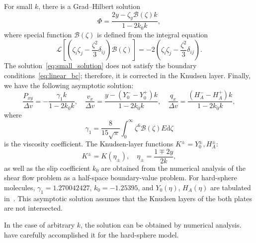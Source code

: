 \documentclass[]{elsarticle} %
\newcommand{\dd}{\mathrm{d}}
\begin{document}
For small \(k\), there is a Grad--Hilbert solution~\citep[see e.g.][]{Ohwada1990, Sone2007}
\begin{equation}\label{eq:small_solution}
    \Phi = \frac{2y - \zeta_y \mathcal{B}(\zeta) k}{1-2k_0k},
\end{equation}
where special function \(\mathcal{B}(\zeta)\) is defined from the integral equation
\begin{equation}\label{eq:transport_B}
    \mathcal{L}\left[\left(\zeta_i\zeta_j-\frac{\zeta^2}3\delta_{ij}\right) \mathcal{B}(\zeta)\right]
        = -2\left(\zeta_i\zeta_j-\frac{\zeta^2}3\delta_{ij}\right).
\end{equation}
The solution~\eqref{eq:small_solution} does not satisfy the boundary conditions~\eqref{eq:linear_bc};
therefore, it is corrected in the Knudsen layer. Finally, we have the following asymptotic solution:
\begin{equation}\label{eq:small_macro}
    \frac{P_{xy}}{\Delta{v}} = - \frac{\gamma_1 k}{1-2k_0k}, \quad
    \frac{v_x}{\Delta{v}} = \frac{y - (Y_0^--Y_0^+)k}{1-2k_0k}, \quad
    \frac{q_x}{\Delta{v}} = \frac{(H_A^--H_A^+)k}{1-2k_0k},
\end{equation}
where
\begin{equation}\label{eq:gamma_1}
    \gamma_1 = \frac{8}{15\sqrt{\pi}}\int_0^\infty \zeta^6 \mathcal{B}(\zeta)E\dd\zeta
\end{equation}
is the viscosity coefficient.
The Knudsen-layer functions \(K^\pm = Y_0^\pm, H_A^\pm\):
\begin{equation}\label{eq:linear_knudsen_functions}
     K^\pm = K(\eta_\pm), \quad \eta_\pm = \frac{1 \mp 2y}{2k},
\end{equation}
as well as the slip coefficient \(k_0\) are obtained from the numerical analysis
of the shear flow problem as a half-space boundary-value problem.
For hard-sphere molecules, \(\gamma_1 = 1.270042427\), \(k_0 = -1.25395\),
and \(Y_0(\eta)\), \(H_A(\eta)\) are tabulated in~\citet{Ohwada1989creep, Sone2002, Sone2007, Takata2015}.
This asymptotic solution assumes that the Knudsen layers of the both plates are not intersected.

In the case of arbitrary \(k\), the solution can be obtained by numerical analysis.
\citet{Ohwada1990} have carefully accomplished it for the hard-sphere model.
\end{document}
